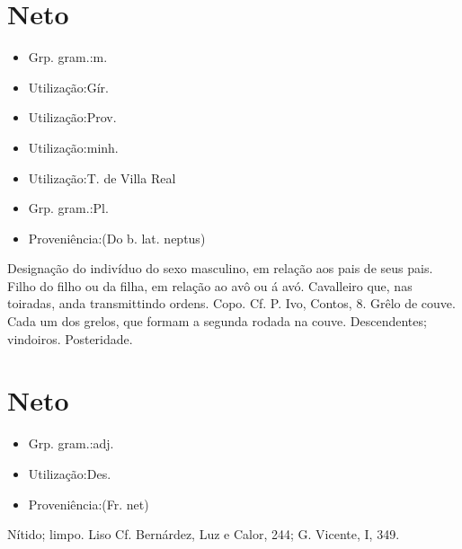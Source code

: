 \section{Neto}
\begin{itemize}
\item {Grp. gram.:m.}
\end{itemize}
\begin{itemize}
\item {Utilização:Gír.}
\end{itemize}
\begin{itemize}
\item {Utilização:Prov.}
\end{itemize}
\begin{itemize}
\item {Utilização:minh.}
\end{itemize}
\begin{itemize}
\item {Utilização:T. de Villa Real}
\end{itemize}
\begin{itemize}
\item {Grp. gram.:Pl.}
\end{itemize}
\begin{itemize}
\item {Proveniência:(Do b. lat. \textunderscore neptus\textunderscore )}
\end{itemize}
Designação do indivíduo do sexo masculino, em relação aos pais de seus pais. Filho do filho ou da filha, em relação ao avô ou á avó.
Cavalleiro que, nas toiradas, anda transmittindo ordens.
Copo. Cf. P. Ivo, \textunderscore Contos\textunderscore , 8.
Grêlo de couve.
Cada um dos grelos, que formam a segunda rodada na couve.
Descendentes; vindoiros.
Posteridade.
\section{Neto}
\begin{itemize}
\item {Grp. gram.:adj.}
\end{itemize}
\begin{itemize}
\item {Utilização:Des.}
\end{itemize}
\begin{itemize}
\item {Proveniência:(Fr. \textunderscore net\textunderscore )}
\end{itemize}
Nítido; limpo.
Liso Cf. Bernárdez, \textunderscore Luz e Calor\textunderscore , 244; G. Vicente, I, 349.
